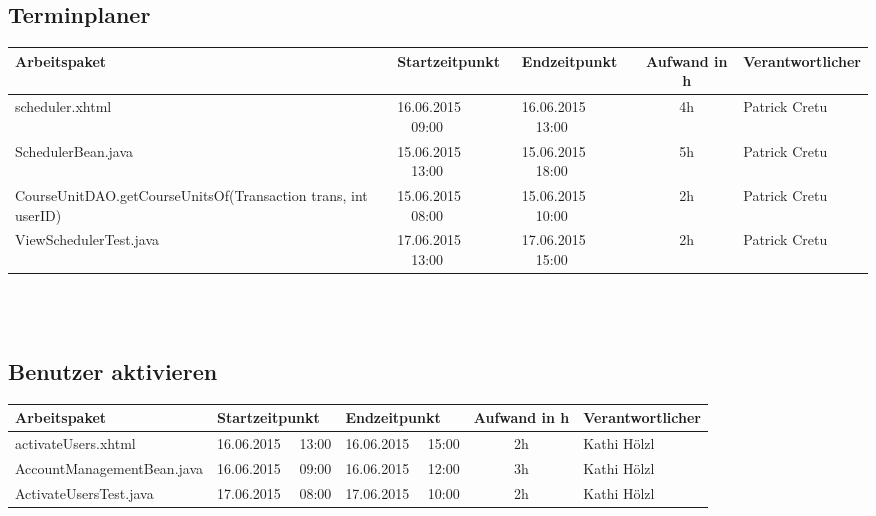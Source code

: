 \begin{landscape}
	\subsection{Terminplaner}
	\begin{tabular}{|p{10.3cm}|p{3.2cm}|p{3.2cm}|c|p{3.5cm}|}
		\hline  \textbf{Arbeitspaket} & \textbf{Startzeitpunkt} & \textbf{Endzeitpunkt} & \textbf{Aufwand in h} & \textbf{Verantwortlicher} \\ 
		\hline   scheduler.xhtml                                 & 16.06.2015 \ \ 09:00        & 16.06.2015 \ \ 13:00        &  4h                 & Patrick Cretu\\ 
		\hline   SchedulerBean.java                              & 15.06.2015 \ \ 13:00        & 15.06.2015 \ \ 18:00        &  5h                 & Patrick Cretu\\ 
		\hline   CourseUnitDAO.getCourseUnitsOf(Transaction trans, int userID)  & 15.06.2015 \ \ 08:00        & 15.06.2015 \ \ 10:00        &  2h  & Patrick Cretu\\ 
		\hline ViewSchedulerTest.java & 17.06.2015 \ \ 13:00 & 17.06.2015 \ \ 15:00 & 2h & Patrick Cretu\\
		\hline 
	\end{tabular} \ \\
	\ \\
	
	\subsection{Benutzer aktivieren}
	\begin{tabular}{|p{10.3cm}|p{3.2cm}|p{3.2cm}|c|p{3.5cm}|}
		\hline  \textbf{Arbeitspaket} & \textbf{Startzeitpunkt} & \textbf{Endzeitpunkt} & \textbf{Aufwand in h} & \textbf{Verantwortlicher} \\ 
		\hline   activateUsers.xhtml                                 & 16.06.2015 \ \ 13:00     & 16.06.2015 \ \ 15:00     &      2h               & Kathi Hölzl\\
		\hline   AccountManagementBean.java                          & 16.06.2015 \ \ 09:00     & 16.06.2015 \ \ 12:00     &      3h               & Kathi Hölzl\\
		\hline   ActivateUsersTest.java                              & 17.06.2015 \ \ 08:00     & 17.06.2015 \ \ 10:00     &      2h               & Kathi Hölzl\\
		\hline 
	\end{tabular} \ \\
	\ \\
	

\end{landscape}
